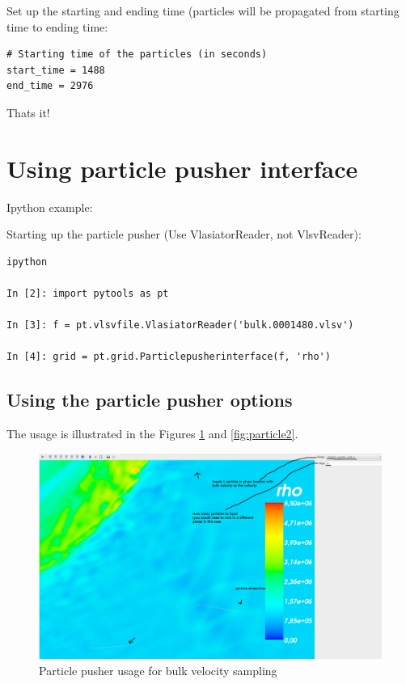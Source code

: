 \documentclass[a4paper,10pt]{article}
\begin{document}
Set up the starting and ending time (particles will be propagated from starting time to ending time:

\begin{verbatim}
# Starting time of the particles (in seconds)
start_time = 1488
end_time = 2976
\end{verbatim}

Thats it!

\section{Using particle pusher interface}

Ipython example:

Starting up the particle pusher (Use VlasiatorReader, not VlsvReader):

\begin{verbatim}
ipython

In [2]: import pytools as pt

In [3]: f = pt.vlsvfile.VlasiatorReader('bulk.0001480.vlsv')

In [4]: grid = pt.grid.Particlepusherinterface(f, 'rho')
\end{verbatim}

\subsection{Using the particle pusher options}

The usage is illustrated in the Figures \ref{fig:particle1} and \ref{fig:particle2}.

\begin{figure}[H]
 \centering
 \includegraphics[width=\textwidth]{../images/particlepusherbulk.png}
 \caption{Particle pusher usage for bulk velocity sampling}
 \label{fig:particle1}
\end{figure}
\end{document}
